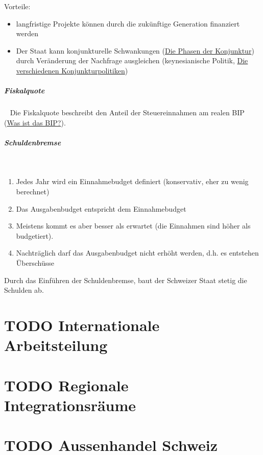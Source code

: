 \documentclass[11pt,twoside,landscape]{article}
\begin{document}
\begin{multicols}{3}
Vorteile:
\begin{itemize}
\item langfristige Projekte können durch die zukünftige Generation finanziert werden
\item Der Staat kann konjunkturelle Schwankungen (\href{../../../roam/20220614102344-die_phasen_der_konjunktur.org}{Die Phasen der Konjunktur}) durch Veränderung der Nachfrage ausgleichen (keynesianische Politik, \href{../../../roam/20220614161544-die_verschiedenen_konjunkturpolitiken.org}{Die verschiedenen Konjunkturpolitiken})
\end{itemize}

\subparagraph{Fiskalquote} \
\label{sec:org90cfb6e}
Die Fiskalquote beschreibt den Anteil der Steuereinnahmen am realen BIP (\href{../../../roam/20220504151208-was_ist_das_bip.org}{Was ist das BIP?}).

\subparagraph{Schuldenbremse} \
\label{sec:orgac64615}
\begin{enumerate}
\item Jedes Jahr wird ein Einnahmebudget definiert (konservativ, eher zu wenig berechnet)
\item Das Ausgabenbudget entspricht dem Einnahmebudget
\item Meistens kommt es aber besser als erwartet (die Einnahmen sind höher als budgetiert).
\item Nachträglich darf das Ausgabenbudget nicht erhöht werden, d.h. es entstehen Überschüsse
\end{enumerate}


Durch das Einführen der Schuldenbremse, baut der Schweizer Staat stetig die Schulden ab.

\section{{\bfseries\sffamily TODO} Internationale Arbeitsteilung}
\label{sec:orgb7f8082}
\section{{\bfseries\sffamily TODO} Regionale Integrationsräume}
\label{sec:orgfcd43a4}
\section{{\bfseries\sffamily TODO} Aussenhandel Schweiz}
\label{sec:orgba0999e}
\end{multicols}
\end{document}
